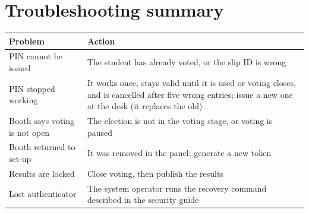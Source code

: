 
\section{Troubleshooting summary}

\begin{center}
\small
\begin{tabularx}{\linewidth}{@{}>{\raggedright}p{5cm}X@{}}
\toprule
\textbf{Problem} & \textbf{Action} \\
\midrule
PIN cannot be issued & The student has already voted, or the slip ID is wrong \\
PIN stopped working & It works once, stays valid until it is used or voting closes, and is cancelled after five wrong entries; issue a new one at the desk (it replaces the old) \\
Booth says voting is not open & The election is not in the voting stage, or voting is paused \\
Booth returned to set-up & It was removed in the panel; generate a new token \\
Results are locked & Close voting, then publish the results \\
Lost authenticator & The system operator runs the recovery command described in the security guide \\
\bottomrule
\end{tabularx}
\end{center}

